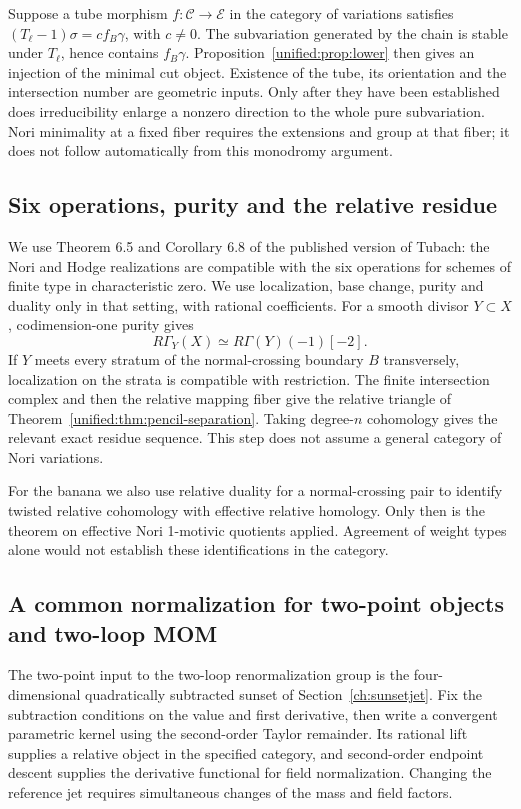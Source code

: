 \documentclass[11pt,a4paper,oneside]{article}
\theoremstyle{plain}
\theoremstyle{definition}
\theoremstyle{remark}
\numberwithin{equation}{section}
\begin{document}
Suppose a tube morphism $f:\mathcal C\to\mathcal E$ in the category of variations satisfies $(T_\ell-1)\sigma=c f_B\gamma$, with $c\ne0$. The subvariation generated by the chain is stable under $T_\ell$, hence contains $f_B\gamma$. Proposition~\ref{unified:prop:lower} then gives an injection of the minimal cut object. Existence of the tube, its orientation and the intersection number are geometric inputs. Only after they have been established does irreducibility enlarge a nonzero direction to the whole pure subvariation. Nori minimality at a fixed fiber requires the extensions and group at that fiber; it does not follow automatically from this monodromy argument.

\subsection{Six operations, purity and the relative residue}
We use Theorem 6.5 and Corollary 6.8 of the published version of Tubach\cite{tubach}: the Nori and Hodge realizations are compatible with the six operations for schemes of finite type in characteristic zero. We use localization, base change, purity and duality only in that setting, with rational coefficients. For a smooth divisor $Y\subset X$, codimension-one purity gives
\[
 R\Gamma_Y(X)\simeq R\Gamma(Y)(-1)[-2].
\]
If $Y$ meets every stratum of the normal-crossing boundary $B$ transversely, localization on the strata is compatible with restriction. The finite intersection complex and then the relative mapping fiber give the relative triangle of Theorem~\ref{unified:thm:pencil-separation}. Taking degree-$n$ cohomology gives the relevant exact residue sequence. This step does not assume a general category of Nori variations.

For the banana we also use relative duality for a normal-crossing pair to identify twisted relative cohomology with effective relative homology. Only then is the theorem on effective Nori 1-motivic quotients applied\cite{abv}. Agreement of weight types alone would not establish these identifications in the category.

\subsection{A common normalization for two-point objects and two-loop MOM}
The two-point input to the two-loop renormalization group is the four-dimensional quadratically subtracted sunset of Section~\ref{ch:sunsetjet}. Fix the subtraction conditions on the value and first derivative, then write a convergent parametric kernel using the second-order Taylor remainder. Its rational lift supplies a relative object in the specified category, and second-order endpoint descent supplies the derivative functional for field normalization. Changing the reference jet requires simultaneous changes of the mass and field factors.
\end{document}
